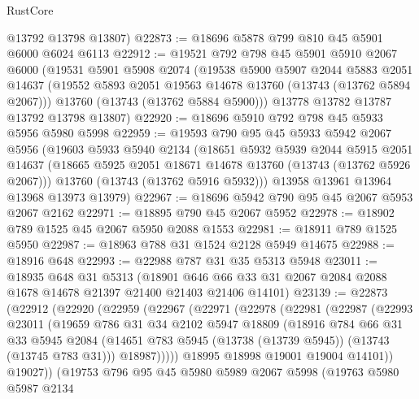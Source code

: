 \begin{lexlean}{RustCore}
\begin{coremodule}
      @13792
      @13798
      @13807)
@22873 := @18696 @5878 @799 @810 @45 @5901 @6000 @6024 @6113
@22912 := @19521
    @792
    @798
    @45
    @5901
    @5910
    @2067
    @6000
    (@19531
      @5901
      @5908
      @2074
      (@19538
        @5900
        @5907
        @2044
        @5883
        @2051
        @14637
        (@19552 @5893 @2051 @19563 @14678 @13760 (@13743 (@13762 @5894 @2067)))
        @13760
        (@13743 (@13762 @5884 @5900)))
      @13778
      @13782
      @13787
      @13792
      @13798
      @13807)
@22920 := @18696 @5910 @792 @798 @45 @5933 @5956 @5980 @5998
@22959 := @19593
    @790
    @95
    @45
    @5933
    @5942
    @2067
    @5956
    (@19603
      @5933
      @5940
      @2134
      (@18651
        @5932
        @5939
        @2044
        @5915
        @2051
        @14637
        (@18665 @5925 @2051 @18671 @14678 @13760 (@13743 (@13762 @5926 @2067)))
        @13760
        (@13743 (@13762 @5916 @5932)))
      @13958
      @13961
      @13964
      @13968
      @13973
      @13979)
@22967 := @18696 @5942 @790 @95 @45 @2067 @5953 @2067 @2162
@22971 := @18895 @790 @45 @2067 @5952
@22978 := @18902 @789 @1525 @45 @2067 @5950 @2088 @1553
@22981 := @18911 @789 @1525 @5950
@22987 := @18963 @788 @31 @1524 @2128 @5949 @14675
@22988 := @18916 @648
@22993 := @22988 @787 @31 @35 @5313 @5948
@23011 := @18935
    @648
    @31
    @5313
    (@18901 @646 @66 @33 @31 @2067 @2084 @2088 @1678 @14678 @21397 @21400 @21403 @21406 @14101)
@23139 := @22873
    (@22912
      (@22920
        (@22959
          (@22967
            (@22971
              (@22978
                (@22981
                  (@22987
                    (@22993
                      @23011
                      (@19659
                        @786
                        @31
                        @34
                        @2102
                        @5947
                        @18809
                        (@18916
                          @784
                          @66
                          @31
                          @33
                          @5945
                          @2084
                          (@14651 @783 @5945 (@13738 (@13739 @5945)) (@13743 (@13745 @783 @31)))
                          @18987)))))
                @18995
                @18998
                @19001
                @19004
                @14101))
            @19027))
        (@19753
          @796
          @95
          @45
          @5980
          @5989
          @2067
          @5998
          (@19763
            @5980
            @5987
            @2134

\end{coremodule}
\end{lexlean}
